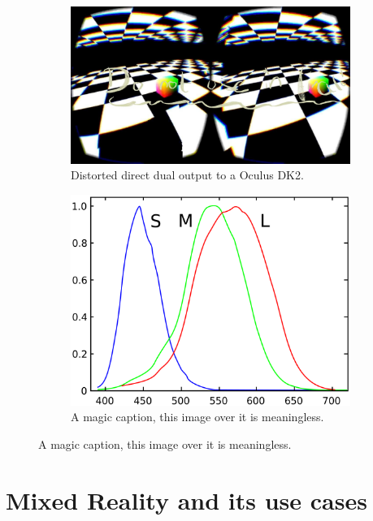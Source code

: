 \begin{figure}[htbp]
	\label{fig:evolution:steps}
	\begin{subfigure}[t]{.45\textwidth}
		\centering
		\includegraphics[width=\textwidth]{_raw_resources/lens_distortion.jpeg}
		\caption{Distorted direct dual output to a Oculus DK2.}
	\end{subfigure}
	\begin{subfigure}[t]{.45\textwidth}
		\centering
		\includegraphics[width=\textwidth]{_external/media/1280px-Cones_SMJ2_E.png}
		\caption{A magic caption, this image over it is meaningless.}
	\end{subfigure}
\end{figure}


\section{Mixed Reality and its use cases}



